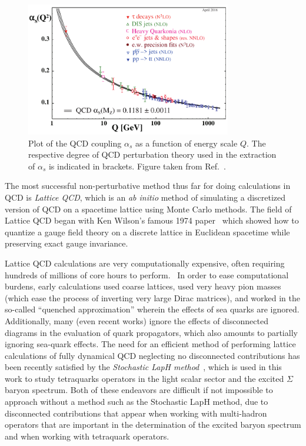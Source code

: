 \begin{figure}
    \centering
    \hspace*{-0.1in}\includegraphics[width=0.8\textwidth]{figures/alpha_s.pdf}
    \caption[Plot of the QCD coupling $\alpha_s$ as a function of energy scale $Q$.]{Plot of the QCD coupling $\alpha_s$ as a function of energy scale $Q$. The respective degree of QCD perturbation theory used in the extraction of $\alpha_s$ is indicated in brackets. Figure taken from Ref.~\cite{PhysRevD.98.030001}.}\label{fig:alpha_s}
\end{figure}

The most successful non-perturbative method thus far for doing calculations in QCD is \emph{Lattice QCD}, which is an \emph{ab initio} method of simulating a discretized version of QCD on a spacetime lattice using Monte Carlo methods. The field of Lattice QCD began with Ken Wilson's famous 1974 paper~\cite{Wilson:1974sk} which showed how to quantize a gauge field theory on a discrete lattice in Euclidean spacetime while preserving exact gauge invariance.

Lattice QCD calculations are very computationally expensive, often requiring hundreds of millions of core hours to perform.~\cite{Fallica2018} In order to ease computational burdens, early calculations used coarse lattices, used very heavy pion masses (which ease the process of inverting very large Dirac matrices), and worked in the so-called ``quenched approximation'' wherein the effects of sea quarks are ignored. Additionally, many (even recent works) ignore the effects of disconnected diagrams in the evaluation of quark propagators, which also amounts to partially ignoring sea-quark effects. The need for an efficient method of performing lattice calculations of fully dynamical QCD neglecting no disconnected contributions has been recently satisfied by the \emph{Stochastic LapH method}~\cite{Morningstar:2011ka}, which is used in this work to study tetraquarks operators in the light scalar sector and the excited $\Sigma$ baryon spectrum. Both of these endeavors are difficult if not impossible to approach without a method such as the Stochastic LapH method, due to disconnected contributions that appear when working with multi-hadron operators that are important in the determination of the excited baryon spectrum and when working with tetraquark operators.

